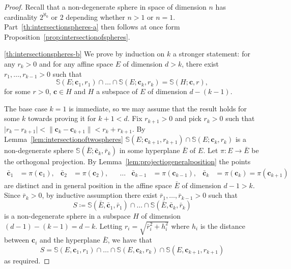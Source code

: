 \documentclass[12pt]{amsart}
\newcommand{\card}[1]{\mathopen | #1 \mathclose |}		%
\theoremstyle{plain}
\theoremstyle{definition}
\theoremstyle{remark}
\begin{document}
\begin{proof}
Recall that a non-degenerate sphere in space of dimension \( n \) has cardinality \( 2^{\aleph_0} \) or \( 2 \) depending whether \( n > 1 \) or \( n = 1 \).
Part~\ref{th:intersectionspheres-a} then follows at once form Proposition~\ref{prop:intersectionofspheres}.

\ref{th:intersectionspheres-b}
We prove by induction on \( k \) a stronger statement: for any \( r_k > 0 \) and for any affine space \( E \) of dimension \( d > k \), there exist \( r_1 , \dots , r_{k- 1} > 0 \) such that 
\[
\mathbb{S} ( E ; \mathbf{c}_1 , r_1 ) \cap \dots \cap \mathbb{S} ( E ; \mathbf{c}_k , r_k ) = \mathbb{S} ( H ; \mathbf{c} , r ) ,
\] 
for some \( r > 0 \), \( \mathbf{c} \in H \) and \( H \) a subspace of \( E \) of dimension \( d - ( k - 1 ) \).

The base case \( k = 1 \) is immediate, so we may assume that the result holds for some \( k \) towards proving it for \( k + 1 < d \).
Fix \( r_{ k + 1 } > 0 \) and pick \( r_k > 0 \) such that \( \card{ r_k - r_{ k + 1 } } < \| \mathbf{c}_k - \mathbf{c}_{ k + 1 } \| < r_k + r_{ k + 1 } \).
By Lemma~\ref{lem:intersectionoftwospheres} \( \mathbb{S} ( E ; \mathbf{c}_{ k + 1 } , r _{ k + 1 } ) \cap \mathbb{S} ( E ; \mathbf{c}_k , r _k ) \) is a non-degenerate sphere \( \mathbb{S} ( \bar{E} ; \bar{\mathbf{c}}_{ k } , \bar{r} _{ k } ) \) in some hyperplane \( \bar{E} \) of \( E \).
Let \( \pi \colon E \to \bar{E} \) be the orthogonal projection. 
By Lemma~\ref{lem:projectiogeneralposition} the points
\begin{align*}
 \bar{\mathbf{c}}_1 & = \pi ( \mathbf{c}_1 ) , & \bar{\mathbf{c}}_2 & = \pi ( \mathbf{c}_2 ) , & &\dots & \bar{\mathbf{c}}_{k - 1} & = \pi ( \mathbf{c}_{ k - 1} ) , & \bar{\mathbf{c}}_k & = \pi ( \mathbf{c}_k ) = \pi ( \mathbf{c}_{ k + 1 } )
\end{align*}
are distinct and in general position in the affine space \( \bar{E} \) of dimension \( d - 1 > k \).
Since \( \bar{r} _{ k } > 0 \), by inductive assumption there exist \( \bar{r}_1 , \dots , \bar{r}_{ k - 1} > 0 \) such that 
\[
 S \coloneqq \mathbb{S} ( \bar{E} , \bar{\mathbf{c}}_1 , \bar{r}_1 ) \cap \dots \cap \mathbb{S} ( \bar{E} , \bar{\mathbf{c}}_k , \bar{r}_k ) 
\]
is a non-degenerate sphere in a subspace \( H \) of dimension \( ( d - 1 ) - ( k - 1 ) = d - k \).
Letting \( r_i = \sqrt{ \bar{r}_i^2 + h_i^2 } \) where \( h_i \) is the distance between \( \mathbf{c}_i \) and the hyperplane \( \bar{E} \), we have that
\[
 S = \mathbb{S} (E , \mathbf{c}_1 , r_1 ) \cap \dots \cap \mathbb{S} ( E , \mathbf{c}_k , r_k ) \cap \mathbb{S} ( E , \mathbf{c}_{k + 1} , r_{k + 1} )
\]
as required.
\end{proof}
\end{document}
